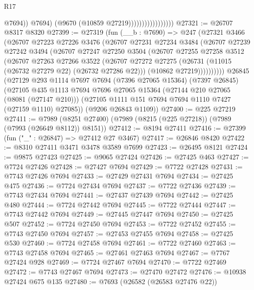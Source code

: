 \begin{lexlean}{R17}
\begin{coremodule}
                                        @7694))
                                    @7694)
                                  (@9670 (@10859 @27219)))))))))))))))))
@27321 := @26707 @8317 @8320
@27399 := @27319
    (fun (__b : @7690) =>
    @247
      (@27321
        @3466
        (@26707
          @27223
          @27226
          @3476
          (@26707
            @27231
            @27234
            @3484
            (@26707
              @27239
              @27242
              @3494
              (@26707
                @27247
                @27250
                @3504
                (@26707
                  @27255
                  @27258
                  @3512
                  (@26707
                    @27263
                    @27266
                    @3522
                    (@26707
                      @27272
                      @27275
                      (@26731 (@11015 (@26732 @27279 @22) (@26732 @27286 @22)))
                      (@10862 @27219))))))))))
    @26845
    (@27129
      @293
      @1114
      @7697
      @7694
      (@7396 @27065 @15364)
      (@7397 @26845)
      (@27105
        @435
        @1113
        @7694
        @7696
        @27065
        @15364
        (@27144 @210 @27065 (@8081 (@27147 @210)))
        (@27105 @1111 @151 @7694 @7694 @1110 @7427 (@27159 @1110) @27085))
      (@9206 @26843 @1109))
@27400 := @225 @27219
@27411 := @7989 (@8251 @27400) (@7989 (@8215 (@225 @27218)) (@7989 (@7993 (@26649 @8112)) @8151))
@27412 := @8194 @27411
@27416 := @27399 (fun ("_" : @26847) => @27412 @27 @3467)
@27417 := @26846 @8420
@27422 := @8310 @27411 @3471 @3478 @3589 @7699
@27423 := @26495 @8121
@27424 := @9875 @27423
@27425 := @9065 @27424
@27426 := @27425 @463
@27427 := @7724 @27426
@27428 := @27427 @7694
@27429 := @7722 @27428
@27431 := @7743 @27426 @7694
@27433 := @27429 @27431 @7694
@27434 := @27425 @475
@27436 := @7724 @27434 @7694
@27437 := @7722 @27436
@27439 := @7743 @27434 @7694
@27441 := @27437 @27439 @7694
@27442 := @27425 @480
@27444 := @7724 @27442 @7694
@27445 := @7722 @27444
@27447 := @7743 @27442 @7694
@27449 := @27445 @27447 @7694
@27450 := @27425 @507
@27452 := @7724 @27450 @7694
@27453 := @7722 @27452
@27455 := @7743 @27450 @7694
@27457 := @27453 @27455 @7694
@27458 := @27425 @530
@27460 := @7724 @27458 @7694
@27461 := @7722 @27460
@27463 := @7743 @27458 @7694
@27465 := @27461 @27463 @7694
@27467 := @7767 @27424 @928
@27469 := @7724 @27467 @7694
@27470 := @7722 @27469
@27472 := @7743 @27467 @7694
@27473 := @27470 @27472
@27476 := @10938 @27424 @675 @135
@27480 := @7693 (@26582 (@26583 @27476 @22))

\end{coremodule}
\end{lexlean}

